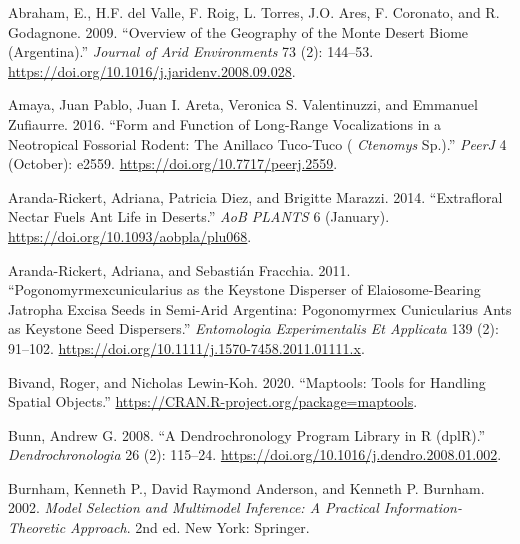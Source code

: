 \documentclass[english,msc,numbers,hidelinks]{coppe}
\newlength{\cslhangindent}
\newenvironment{CSLReferences}[2] %
 {%
  \setlength{\parindent}{0pt}
  \ifodd #1 \everypar{\setlength{\hangindent}{\cslhangindent}}\ignorespaces\fi
  \ifnum #2 > 0
  \setlength{\parskip}{#2\baselineskip}
  \fi
 }%
 {}
\begin{document}
  \setlength{\parindent}{-0.20in}
  \setlength{\leftskip}{0.20in}
  \setlength{\parskip}{8pt}

  \hypertarget{refs}{}
  \begin{CSLReferences}{1}{0}
  \leavevmode{}%
  Abraham, E., H.F. del Valle, F. Roig, L. Torres, J.O. Ares, F. Coronato, and R. Godagnone. 2009. {``Overview of the Geography of the Monte Desert Biome (Argentina).''} \emph{Journal of Arid Environments} 73 (2): 144--53. \url{https://doi.org/10.1016/j.jaridenv.2008.09.028}.

  \leavevmode{}%
  Amaya, Juan Pablo, Juan I. Areta, Veronica S. Valentinuzzi, and Emmanuel Zufiaurre. 2016. {``Form and Function of Long-Range Vocalizations in a Neotropical Fossorial Rodent: The Anillaco Tuco-Tuco ( {\emph{Ctenomys}} Sp.).''} \emph{PeerJ} 4 (October): e2559. \url{https://doi.org/10.7717/peerj.2559}.

  \leavevmode{}%
  Aranda-Rickert, Adriana, Patricia Diez, and Brigitte Marazzi. 2014. {``Extrafloral Nectar Fuels Ant Life in Deserts.''} \emph{AoB PLANTS} 6 (January). \url{https://doi.org/10.1093/aobpla/plu068}.

  \leavevmode{}%
  Aranda-Rickert, Adriana, and Sebastián Fracchia. 2011. {``Pogonomyrmexcunicularius as the Keystone Disperser of Elaiosome-Bearing Jatropha Excisa Seeds in Semi-Arid Argentina: Pogonomyrmex Cunicularius Ants as Keystone Seed Dispersers.''} \emph{Entomologia Experimentalis Et Applicata} 139 (2): 91--102. \url{https://doi.org/10.1111/j.1570-7458.2011.01111.x}.

  \leavevmode{}%
  Bivand, Roger, and Nicholas Lewin-Koh. 2020. {``Maptools: Tools for Handling Spatial Objects.''} \url{https://CRAN.R-project.org/package=maptools}.

  \leavevmode{}%
  Bunn, Andrew G. 2008. {``A Dendrochronology Program Library in R (dplR).''} \emph{Dendrochronologia} 26 (2): 115--24. \url{https://doi.org/10.1016/j.dendro.2008.01.002}.

  \leavevmode{}%
  Burnham, Kenneth P., David Raymond Anderson, and Kenneth P. Burnham. 2002. \emph{Model Selection and Multimodel Inference: A Practical Information-Theoretic Approach}. 2nd ed. New York: Springer.


\end{CSLReferences}
\end{document}
